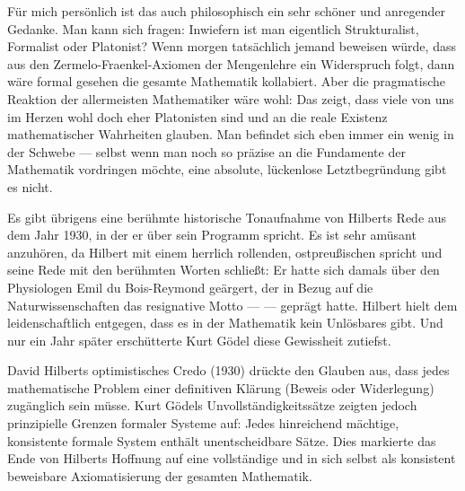 \begin{spoken-clean}[01:06:50 - 01:09:50]
Für mich persönlich ist das auch philosophisch ein sehr schöner und anregender Gedanke. Man kann sich fragen: Inwiefern ist man eigentlich Strukturalist, Formalist oder Platonist? Wenn morgen tatsächlich jemand beweisen würde, dass aus den Zermelo-Fraenkel-Axiomen der Mengenlehre ein Widerspruch folgt, dann wäre formal gesehen die gesamte Mathematik kollabiert. Aber die pragmatische Reaktion der allermeisten Mathematiker wäre wohl:  Das zeigt, dass viele von uns im Herzen wohl doch eher Platonisten sind und an die reale Existenz mathematischer Wahrheiten glauben. Man befindet sich eben immer ein wenig in der Schwebe --- selbst wenn man noch so präzise an die Fundamente der Mathematik vordringen möchte, eine absolute, lückenlose Letztbegründung gibt es nicht.

Es gibt übrigens eine berühmte historische Tonaufnahme von Hilberts Rede aus dem Jahr 1930, in der er über sein Programm spricht. Es ist sehr amüsant anzuhören, da Hilbert mit einem herrlich rollenden, ostpreußischen  spricht und seine Rede mit den berühmten Worten schließt:  Er hatte sich damals über den Physiologen Emil du Bois-Reymond geärgert, der in Bezug auf die Naturwissenschaften das resignative Motto  ---  --- geprägt hatte. Hilbert hielt dem leidenschaftlich entgegen, dass es in der Mathematik kein Unlösbares gibt. Und nur ein Jahr später erschütterte Kurt Gödel diese Gewissheit zutiefst.
\end{spoken-clean}

\begin{didactic-insight}
David Hilberts optimistisches Credo  (1930) drückte den Glauben aus, dass jedes mathematische Problem einer definitiven Klärung (Beweis oder Widerlegung) zugänglich sein müsse. Kurt Gödels Unvollständigkeitssätze zeigten jedoch prinzipielle Grenzen formaler Systeme auf: Jedes hinreichend mächtige, konsistente formale System enthält unentscheidbare Sätze. Dies markierte das Ende von Hilberts Hoffnung auf eine vollständige und in sich selbst als konsistent beweisbare Axiomatisierung der gesamten Mathematik.
\end{didactic-insight}

